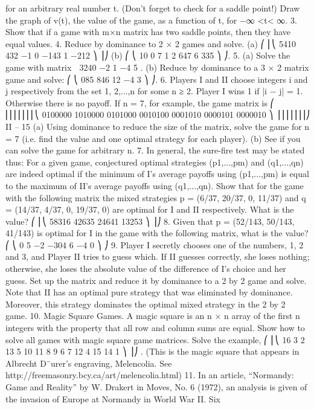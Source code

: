 for an arbitrary real number t. (Don’t forget
to check for a saddle point!) Draw the graph of v(t), the value of the game, as a function
of t, for −∞ <t< ∞.
3. Show that if a game with m×n matrix has two saddle points, then they have equal
values.
4. Reduce by dominance to 2 × 2 games and solve.
(a)
⎛
⎜⎝
5410
432 −1
0 −143
1 −212
⎞
⎟⎠ (b)
⎛
⎝
10 0 7 1
2 647
6 335
⎞
⎠.
5. (a) Solve the game with matrix  3240
−2 1 −4 5
.
(b) Reduce by dominance to a 3 × 2 matrix game and solve:
⎛
⎝
085
846
12 −4 3
⎞
⎠.
6. Players I and II choose integers i and j respectively from the set {1, 2,...,n} for
some n ≥ 2. Player I wins 1 if |i − j| = 1. Otherwise there is no payoff. If n = 7, for
example, the game matrix is
⎛
⎜⎜⎜⎜⎜⎜⎜⎝
0100000
1010000
0101000
0010100
0001010
0000101
0000010
⎞
⎟⎟⎟⎟⎟⎟⎟⎠
II – 15
(a) Using dominance to reduce the size of the matrix, solve the game for n = 7 (i.e.
find the value and one optimal strategy for each player).
(b) See if you can solve the game for arbitrary n.
7. In general, the sure-fire test may be stated thus: For a given game, conjectured
optimal strategies (p1,...,pm) and (q1,...,qn) are indeed optimal if the minimum of I’s
average payoffs using (p1,...,pm) is equal to the maximum of II’s average payoffs using
(q1,...,qn). Show that for the game with the following matrix the mixed strategies
p = (6/37, 20/37, 0, 11/37) and q = (14/37, 4/37, 0, 19/37, 0) are optimal for I and II respectively.
What is the value?
⎛
⎜⎝
58316
42635
24641
13253
⎞
⎟⎠
8. Given that p = (52/143, 50/143, 41/143) is optimal for I in the game with the
following matrix, what is the value?
⎛
⎝
0 5 −2
−304
6 −4 0
⎞
⎠
9. Player I secretly chooses one of the numbers, 1, 2 and 3, and Player II tries to guess
which. If II guesses correctly, she loses nothing; otherwise, she loses the absolute value of
the difference of I’s choice and her guess. Set up the matrix and reduce it by dominance
to a 2 by 2 game and solve. Note that II has an optimal pure strategy that was eliminated
by dominance. Moreover, this strategy dominates the optimal mixed strategy in the 2 by
2 game.
10. Magic Square Games. A magic square is an n × n array of the first n integers
with the property that all row and column sums are equal. Show how to solve all games
with magic square game matrices. Solve the example,
⎛
⎜⎝
16 3 2 13
5 10 11 8
9 6 7 12
4 15 14 1
⎞
⎟⎠ .
(This is the magic square that appears in Albrecht D¨urer’s engraving, Melencolia. See
http://freemasonry.bcy.ca/art/melencolia.html)
11. In an article, “Normandy: Game and Reality” by W. Drakert in Moves, No. 6
(1972), an analysis is given of the invasion of Europe at Normandy in World War II. Six
